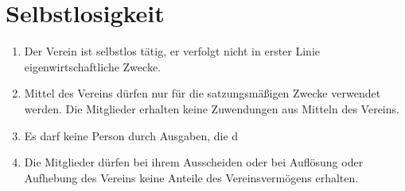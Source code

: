 \section{Selbstlosigkeit}
\begin{enumerate}
  \item Der Verein ist selbstlos tätig, er verfolgt nicht in erster Linie eigenwirtschaftliche Zwecke.
  \item Mittel des Vereins dürfen nur für die satzungsmäßigen Zwecke verwendet werden. Die Mitglieder erhalten keine Zuwendungen aus Mitteln des Vereins.
  \item Es darf keine Person durch Ausgaben, die d
  \item Die Mitglieder dürfen bei ihrem Ausscheiden oder bei Auflösung oder Aufhebung des Vereins keine Anteile des Vereinsvermögens erhalten.
\end{enumerate}

